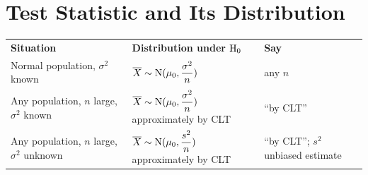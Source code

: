 \section{Test Statistic and Its Distribution}
\begin{center}\bba\small
\begin{tabular}{|L{5.6cm}|M{5.2cm}|L{4.4cm}|}\hline
\textbf{Situation} & \textbf{Distribution under $\mathrm{H}_{0}$} & \textbf{Say}\\\Xhline{2pt}
Normal population, $\sigma^{2}$ known & $\overline{X}\sim\mathrm{N}(\mu_{0},\dfrac{\sigma^{2}}{n})$ & any $n$\\\hline
Any population, $n$ large, $\sigma^{2}$ known & $\overline{X}\sim\mathrm{N}(\mu_{0},\dfrac{\sigma^{2}}{n})$ approximately by CLT & ``by CLT''\\\hline
Any population, $n$ large, $\sigma^{2}$ unknown & $\overline{X}\sim\mathrm{N}(\mu_{0},\dfrac{s^{2}}{n})$ approximately by CLT & ``by CLT''; $s^{2}$ unbiased estimate\\\hline
\end{tabular}\end{center}
\clearpage
